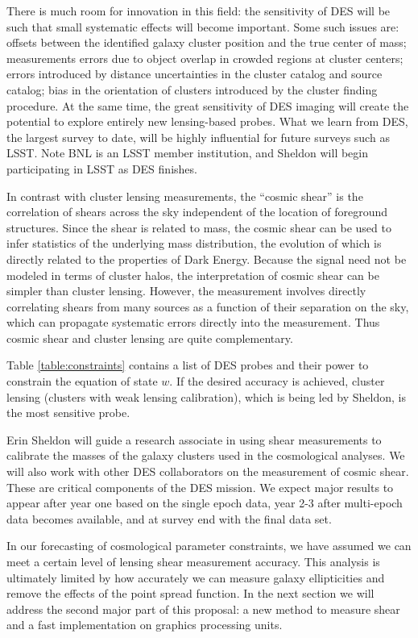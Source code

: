 \documentclass[12pt]{article}
\begin{document}
There is much room for innovation in this field: the sensitivity of DES will be
such that small systematic effects will become important. Some such issues are:
offsets between the identified galaxy cluster position and the true center of
mass; measurements errors due to object overlap in crowded regions at cluster
centers; errors introduced by distance uncertainties in the cluster catalog and
source catalog; bias in the orientation of clusters introduced by the cluster
finding procedure.  At the same time, the great sensitivity of DES imaging will
create the potential to explore entirely new lensing-based probes.  What we
learn from DES, the largest survey to date, will be highly influential for
future surveys such as LSST. Note BNL is an LSST member institution, and
Sheldon will begin participating in LSST as DES finishes.

In contrast with cluster lensing measurements, the ``cosmic shear'' is the
correlation of shears across the sky independent of the location of foreground
structures.  Since the shear is related to mass, the cosmic shear can be used
to infer statistics of the underlying mass distribution, the evolution of which
is directly related to the properties of Dark Energy.  Because the signal need
not be modeled in terms of cluster halos, the interpretation of cosmic shear
can be simpler than cluster lensing.  However, the measurement involves
directly correlating shears from many sources as a function of their separation
on the sky, which can propagate systematic errors directly into the
measurement. Thus cosmic shear and cluster lensing are quite complementary.

Table \ref{table:constraints} contains a list of DES probes and their power to
constrain the equation of state $w$.  If the desired accuracy is achieved,
cluster lensing (clusters with weak lensing calibration), which is being led by
Sheldon, is the most sensitive probe.

Erin Sheldon will guide a research associate in using shear measurements to
calibrate the masses of the galaxy clusters used in the cosmological analyses.
We will also work with other DES collaborators on the measurement of cosmic
shear.  These are critical components of the DES mission.  We expect major
results to appear after year one based on the single epoch data, year 2-3 after
multi-epoch data becomes available, and at survey end with the final data set.

In our forecasting of cosmological parameter constraints, we have assumed we
can meet a certain level of lensing shear measurement accuracy.  This analysis
is ultimately limited by how accurately we can measure galaxy ellipticities and
remove the effects of the point spread function.  In the next section we will
address the second major part of this proposal: a new method to measure shear
and a fast implementation on graphics processing units.
\end{document}
